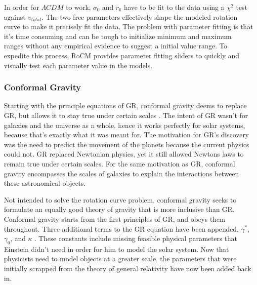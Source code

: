 \documentclass[conference]{IEEEtran}
\begin{document}
In order for $\Lambda CDM$ to work, $\sigma_0$ and $r_0$ have to be fit to the data using a $\chi^2$ test against $v_{total}$. The two free parameters effectively shape the modeled rotation curve to make it precisely fit the data. The problem with parameter fitting is that it's time consuming and can be tough to initialize minimum and maximum ranges without any empirical evidence to suggest a initial value range. To expedite this process, RoCM provides parameter fitting sliders to quickly and visually test each parameter value in the models.

\subsubsection{Conformal Gravity}
Starting with the principle equations of GR, conformal gravity deems to replace GR, but allows it to stay true under certain scales \cite{mannheim}. The intent of GR wasn't for galaxies and the universe as a whole, hence it works perfectly for solar systems, because that's exactly what it was meant for. The motivation for GR's discovery was the need to predict the movement of the planets because the current physics could not. GR replaced Newtonian physics, yet it still allowed Newtons laws to remain true under certain scales. For the same motivation as GR, conformal gravity encompasses the scales of galaxies to explain the interactions between these astronomical objects. 

Not intended to solve the rotation curve problem, conformal gravity seeks to formulate an equally good theory of gravity that is more inclusive than GR. Conformal gravity starts from the first principles of GR, and obeys them throughout. Three additional terms to the GR equation have been appended, $\gamma^*$, $\gamma_0$, and $\kappa$ \cite{mannheim}. These constants include missing feasible physical parameters that Einstein didn't need in order for him to model the solar system. Now that physicists need to model objects at a greater scale, the parameters that were initially scrapped from the theory of general relativity have now been added back in.
\end{document}
